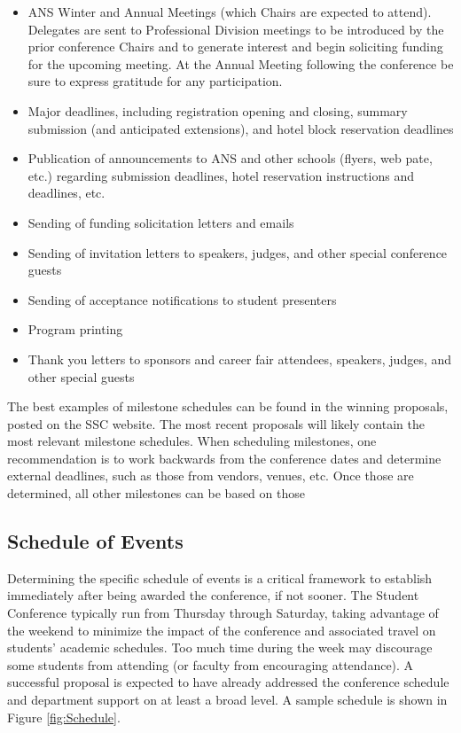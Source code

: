 \documentclass[12pt]{article}
\begin{document}
\begin{itemize}
    \item ANS Winter and Annual Meetings (which Chairs are expected to attend). Delegates are sent to Professional Division meetings to be introduced by the prior conference Chairs and to generate interest and begin soliciting funding for the upcoming meeting. At the Annual Meeting following the conference be sure to express gratitude for any participation.
    \item Major deadlines, including registration opening and closing, summary submission (and anticipated extensions), and hotel block reservation deadlines
    \item Publication of announcements to ANS and other schools (flyers, web pate, etc.) regarding submission deadlines, hotel reservation instructions and deadlines, etc.
    \item Sending of funding solicitation letters and emails
    \item Sending of invitation letters to speakers, judges, and other special conference guests
    \item Sending of acceptance notifications to student presenters
    \item Program printing
    \item Thank you letters to sponsors and career fair attendees, speakers, judges, and other special guests
\end{itemize}

The best examples of milestone schedules can be found in the winning proposals, posted on the SSC website. 
The most recent proposals will likely contain the most relevant milestone schedules.
When scheduling milestones, one recommendation is to work backwards from the conference dates and determine external deadlines, such as those from vendors, venues, etc.
Once those are determined, all other milestones can be based on those

\subsection{Schedule of Events}
Determining the specific schedule of events is a critical framework to establish immediately after being awarded the conference, if not sooner.
The Student Conference typically run from Thursday through Saturday, taking advantage of the weekend to minimize the impact of the conference and associated travel on students' academic schedules.
Too much time during the week may discourage some students from attending (or faculty from encouraging attendance).
A successful proposal is expected to have already addressed the conference schedule and department support on at least a broad level.
A sample schedule is shown in Figure \ref{fig:Schedule}.
\end{document}
